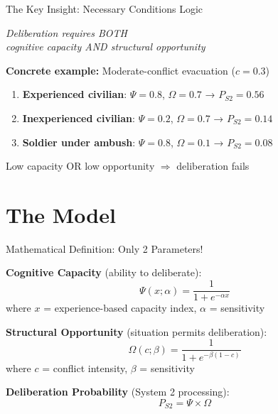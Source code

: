 \documentclass[aspectratio=169]{beamer}
\begin{document}
\begin{frame}{The Key Insight: Necessary Conditions Logic}

\begin{center}
\Large
\textit{Deliberation requires BOTH\\
cognitive capacity AND structural opportunity}
\end{center}

\vspace{1em}

\textbf{Concrete example:} Moderate-conflict evacuation ($c = 0.3$)

\begin{enumerate}
    \item \textbf{Experienced civilian}: $\Psi = 0.8$, $\Omega = 0.7$ → $P_{S2} = 0.56$
    \item \textbf{Inexperienced civilian}: $\Psi = 0.2$, $\Omega = 0.7$ → $P_{S2} = 0.14$  
    \item \textbf{Soldier under ambush}: $\Psi = 0.8$, $\Omega = 0.1$ → $P_{S2} = 0.08$
\end{enumerate}

\vspace{0.5em}
Low capacity OR low opportunity $\Rightarrow$ deliberation fails

\end{frame}

\section{The Model}

\begin{frame}{Mathematical Definition: Only 2 Parameters!}

\textbf{Cognitive Capacity} (ability to deliberate):
\begin{equation*}
\Psi(x; \alpha) = \frac{1}{1 + e^{-\alpha x}}
\end{equation*}
where $x$ = experience-based capacity index, $\alpha$ = sensitivity

\vspace{0.5em}

\textbf{Structural Opportunity} (situation permits deliberation):
\begin{equation*}
\Omega(c; \beta) = \frac{1}{1 + e^{-\beta(1-c)}}
\end{equation*}
where $c$ = conflict intensity, $\beta$ = sensitivity

\vspace{0.5em}

\textbf{Deliberation Probability} (System 2 processing):
\begin{equation*}
\boxed{P_{S2} = \Psi \times \Omega}
\end{equation*}

\end{frame}
\end{document}
